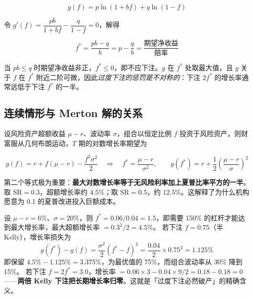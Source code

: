 \begin{equation}\label{eq:11-kelly-g}
  g(f) = p\ln(1+bf) + q\ln(1-f)
\end{equation}

令 $g'(f) = \dfrac{pb}{1+bf} - \dfrac{q}{1-f} = 0$，解得

\begin{equation}\label{eq:11-kelly}
  f^{*} = \frac{pb - q}{b} = p - \frac{q}{b} = \frac{\text{期望净收益}}{\text{赔率}}
\end{equation}

当 $pb \le q$ 时期望净收益非正，$f^{*} \le 0$，即不应下注。$g$ 在 $f^{*}$ 处取最大值，且 $g$ 关于 $f$ 在 $f^{*}$ 附近二阶可微，因此\emph{过度下注的惩罚是不对称的}：下注 $2f^{*}$ 的增长率通常远低于下注 $f^{*}$ 的一半。

\subsection{连续情形与 Merton 解的关系}

设风险资产超额收益 $\mu - r$、波动率 $\sigma$，组合以恒定比例 $f$ 投资于风险资产，则财富服从几何布朗运动，$T$ 期的对数增长率期望为

\begin{equation}\label{eq:11-kelly-cont}
  g(f) = r + f(\mu - r) - \frac{f^{2}\sigma^{2}}{2}
  \quad\Longrightarrow\quad
  f^{*} = \frac{\mu - r}{\sigma^{2}},
  \qquad
  g(f^{*}) = r + \frac{1}{2}\left(\frac{\mu-r}{\sigma}\right)^{2}
\end{equation}

第二个等式极为重要：\textbf{最大对数增长率等于无风险利率加上夏普比率平方的一半}。取 $\text{SR} = 0.3$，超额增长率约 $4.5\%$；取 $\text{SR} = 0.5$，约 $12.5\%$。这解释了为什么机构愿意为 0.1 的夏普改进投入巨额成本。

\begin{example}\label{ex:11-kelly}
设 $\mu - r = 6\%$、$\sigma = 20\%$，则 $f^{*} = 0.06/0.04 = 1.5$，即需要 150\% 的杠杆才能达到最大增长率，最大超额增长率 $= 0.3^{2}/2 = 4.5\%$。
若下注 $f = 0.75$（半 Kelly），增长率损失为
\[
  g(f^{*}) - g(f) = \frac{\sigma^{2}}{2}\left(f^{*} - f\right)^{2}
  = \frac{0.04}{2}\times 0.75^{2} = 1.125\%
\]
即保留 $4.5\% - 1.125\% = 3.375\%$，为最优值的 75\%，而组合波动率从 30\% 降到 15\%。
若下注 $f = 2f^{*} = 3.0$，增长率 $= 0.06\times 3 - 0.04\times 9/2 = 0.18 - 0.18 = 0$——\textbf{两倍 Kelly 下注把长期增长率归零}。这就是「过度下注必然破产」的精确含义。
\end{example}

